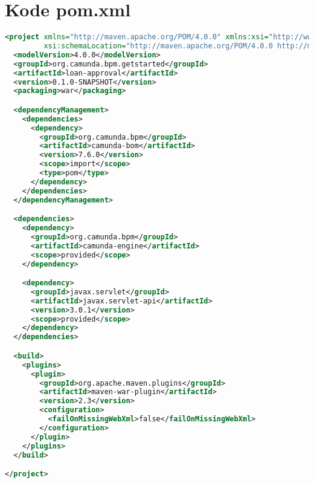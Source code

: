 \chapter{Kode pom.xml}
\label{lamp:pom}

\begin{lstlisting}[language=xml,basicstyle=\tiny,caption=pom.xml]
<project xmlns="http://maven.apache.org/POM/4.0.0" xmlns:xsi="http://www.w3.org/2001/XMLSchema-instance"
         xsi:schemaLocation="http://maven.apache.org/POM/4.0.0 http://maven.apache.org/xsd/maven-4.0.0.xsd">
  <modelVersion>4.0.0</modelVersion>
  <groupId>org.camunda.bpm.getstarted</groupId>
  <artifactId>loan-approval</artifactId>
  <version>0.1.0-SNAPSHOT</version>
  <packaging>war</packaging>

  <dependencyManagement>
    <dependencies>
      <dependency>
        <groupId>org.camunda.bpm</groupId>
        <artifactId>camunda-bom</artifactId>
        <version>7.6.0</version>
        <scope>import</scope>
        <type>pom</type>
      </dependency>
    </dependencies>
  </dependencyManagement>

  <dependencies>
    <dependency>
      <groupId>org.camunda.bpm</groupId>
      <artifactId>camunda-engine</artifactId>
      <scope>provided</scope>
    </dependency>

    <dependency>
      <groupId>javax.servlet</groupId>
      <artifactId>javax.servlet-api</artifactId>
      <version>3.0.1</version>
      <scope>provided</scope>
    </dependency>
  </dependencies>

  <build>
    <plugins>
      <plugin>
        <groupId>org.apache.maven.plugins</groupId>
        <artifactId>maven-war-plugin</artifactId>
        <version>2.3</version>
        <configuration>
          <failOnMissingWebXml>false</failOnMissingWebXml>
        </configuration>
      </plugin>
    </plugins>
  </build>

</project>

\end{lstlisting}